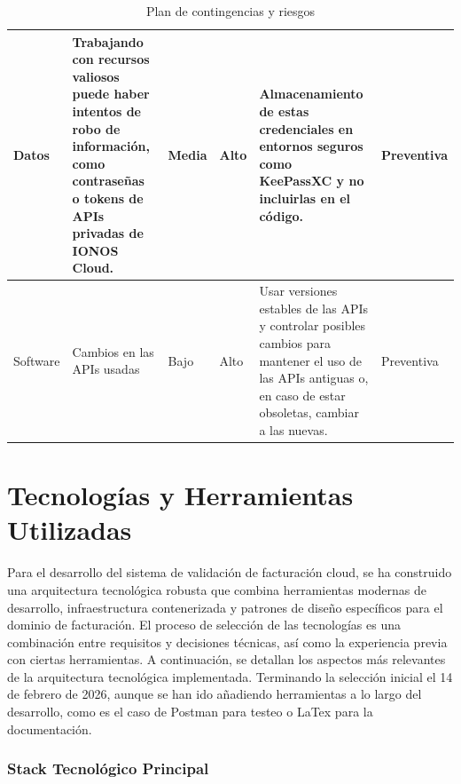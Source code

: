 \begin{table}[h!]
\begin{tabular}{|p{1.5cm}|p{2.5cm}|p{1.5cm}|p{1.5cm}|p{3.8cm}|p{1.8cm}|}
        \hline
        Datos           & Trabajando con recursos valiosos puede haber intentos de robo de información, como contraseñas o tokens de APIs privadas de IONOS Cloud.                                     & Media                 & Alto             & Almacenamiento de estas credenciales en entornos seguros como KeePassXC y no incluirlas en el código.                                                                                                                      & Preventiva              \\
        \hline
        Software        & Cambios en las APIs usadas                                                                                                                                                   & Bajo                  & Alto             & Usar versiones estables de las APIs y controlar posibles cambios para mantener el uso de las APIs antiguas o, en caso de estar obsoletas, cambiar a las nuevas.                                                            & Preventiva              \\
        \hline
    \end{tabular}
    \caption{Plan de contingencias y riesgos}
\end{table}

\clearpage







\section{Tecnologías y Herramientas Utilizadas}

\noindent Para el desarrollo del sistema de validación de facturación cloud, se ha construido una arquitectura tecnológica robusta que combina herramientas modernas de desarrollo, infraestructura contenerizada y patrones de diseño específicos para el dominio de facturación. El proceso de selección de las tecnologías es una combinación entre requisitos y decisiones técnicas, así como la experiencia previa con ciertas herramientas. A continuación, se detallan los aspectos más relevantes de la arquitectura tecnológica implementada. Terminando la selección inicial el 14 de febrero de 2026, aunque se han ido añadiendo herramientas a lo largo del desarrollo, como es el caso de Postman para testeo o LaTex para la documentación.

\subsubsection{Stack Tecnológico Principal}

